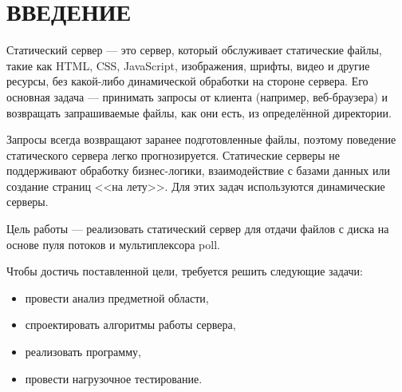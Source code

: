 \chapter*{ВВЕДЕНИЕ}
Статический сервер --- это сервер, который обслуживает статические файлы, такие как 
HTML, CSS, JavaScript, изображения, шрифты, видео и другие ресурсы, 
без какой-либо динамической обработки на стороне сервера. 
Его основная задача --- принимать запросы от клиента (например, веб-браузера) 
и возвращать запрашиваемые файлы, как они есть, из определённой директории.

Запросы всегда возвращают заранее подготовленные файлы, поэтому поведение статического сервера легко прогнозируется.
Статические серверы не поддерживают обработку бизнес-логики, взаимодействие с базами данных или создание страниц <<на лету>>. Для этих задач используются динамические серверы.

Цель работы --- реализовать статический сервер для отдачи файлов с диска
на основе пуля потоков и мультиплексора poll. 

Чтобы достичь поставленной цели, требуется решить следующие задачи:
\begin{itemize}
    \item провести анализ предметной области, 
    \item спроектировать алгоритмы работы сервера, 
    \item реализовать программу,
    \item провести нагрузочное тестирование.
\end{itemize}
